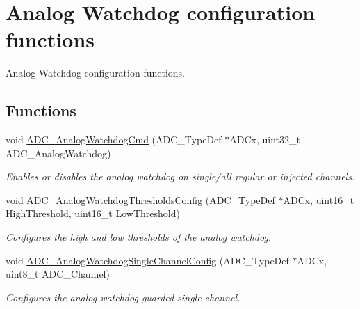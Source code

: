 \hypertarget{group___a_d_c___group2}{\section{Analog Watchdog configuration functions}
\label{group___a_d_c___group2}
}


Analog Watchdog configuration functions.  


\subsection*{Functions}
\begin{DoxyCompactItemize}
\item 
void \hyperlink{group___a_d_c___group2_gad017d69bec6e497afd35ba25ea22d86e}{A\-D\-C\-\_\-\-Analog\-Watchdog\-Cmd} (A\-D\-C\-\_\-\-Type\-Def $\ast$A\-D\-Cx, uint32\-\_\-t A\-D\-C\-\_\-\-Analog\-Watchdog)
\begin{DoxyCompactList}\small\item\em Enables or disables the analog watchdog on single/all regular or injected channels. \end{DoxyCompactList}\item 
void \hyperlink{group___a_d_c___group2_ga79588d02aa8e4147f21cb90a4708366d}{A\-D\-C\-\_\-\-Analog\-Watchdog\-Thresholds\-Config} (A\-D\-C\-\_\-\-Type\-Def $\ast$A\-D\-Cx, uint16\-\_\-t High\-Threshold, uint16\-\_\-t Low\-Threshold)
\begin{DoxyCompactList}\small\item\em Configures the high and low thresholds of the analog watchdog. \end{DoxyCompactList}\item 
void \hyperlink{group___a_d_c___group2_ga03cef3d12292ffa2b8520524d5b0226c}{A\-D\-C\-\_\-\-Analog\-Watchdog\-Single\-Channel\-Config} (A\-D\-C\-\_\-\-Type\-Def $\ast$A\-D\-Cx, uint8\-\_\-t A\-D\-C\-\_\-\-Channel)
\begin{DoxyCompactList}\small\item\em Configures the analog watchdog guarded single channel. \end{DoxyCompactList}\end{DoxyCompactItemize}


